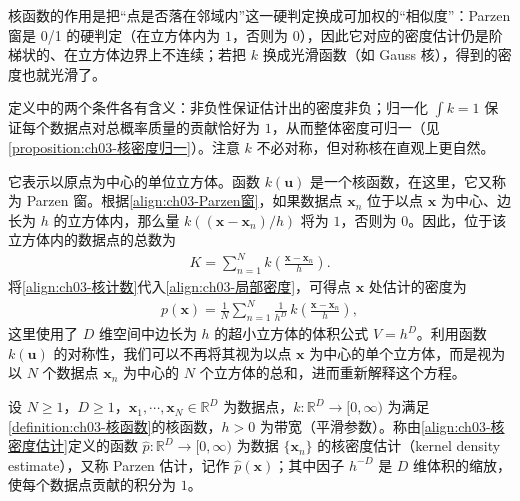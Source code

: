\documentclass[../../main.tex]{subfiles}
\begin{document}
\begin{remark}
核函数的作用是把“点是否落在邻域内”这一硬判定换成可加权的“相似度”：Parzen 窗是 0/1 的硬判定（在立方体内为 $1$，否则为 $0$），因此它对应的密度估计仍是阶梯状的、在立方体边界上不连续；若把 $k$ 换成光滑函数（如 Gauss 核），得到的密度也就光滑了。

定义中的两个条件各有含义：非负性保证估计出的密度非负；归一化 $\int k=1$ 保证每个数据点对总概率质量的贡献恰好为 $1$，从而整体密度可归一（见\cref{proposition:ch03-核密度归一}）。注意 $k$ 不必对称，但对称核在直观上更自然。
\end{remark}

它表示以原点为中心的单位立方体。函数 $k(\boldsymbol{u})$ 是一个核函数，在这里，它又称为 Parzen 窗。根据\eqref{align:ch03-Parzen窗}，如果数据点 $\boldsymbol{x}_n$ 位于以点 $\boldsymbol{x}$ 为中心、边长为 $h$ 的立方体内，那么量 $k((\boldsymbol{x}-\boldsymbol{x}_n)/h)$ 将为 $1$，否则为 $0$。因此，位于该立方体内的数据点的总数为
\begin{align}
K=\sum_{n=1}^{N}k\left(\frac{\boldsymbol{x}-\boldsymbol{x}_n}{h}\right).
\label{align:ch03-核计数}
\end{align}
将\eqref{align:ch03-核计数}代入\eqref{align:ch03-局部密度}，可得点 $\boldsymbol{x}$ 处估计的密度为
\begin{align}
p(\boldsymbol{x})=\frac{1}{N}\sum_{n=1}^{N}\frac{1}{h^{D}}\,k\!\left(\frac{\boldsymbol{x}-\boldsymbol{x}_n}{h}\right),
\label{align:ch03-核密度估计}
\end{align}
这里使用了 $D$ 维空间中边长为 $h$ 的超小立方体的体积公式 $V=h^{D}$。利用函数 $k(\boldsymbol{u})$ 的对称性，我们可以不再将其视为以点 $\boldsymbol{x}$ 为中心的单个立方体，而是视为以 $N$ 个数据点 $\boldsymbol{x}_n$ 为中心的 $N$ 个立方体的总和，进而重新解释这个方程。

\begin{definition}[核密度估计]\label{definition:ch03-核密度}
设 $N\geqslant1$，$D\geqslant1$，$\boldsymbol{x}_1,\cdots,\boldsymbol{x}_N\in\mathbb{R}^{D}$ 为数据点，$k:\mathbb{R}^{D}\to[0,\infty)$ 为满足\cref{definition:ch03-核函数}的核函数，$h>0$ 为带宽（平滑参数）。称由\eqref{align:ch03-核密度估计}定义的函数 $\hat{p}:\mathbb{R}^{D}\to[0,\infty)$ 为数据 $\{\boldsymbol{x}_n\}$ 的核密度估计（kernel density estimate），又称 Parzen 估计，记作 $\hat{p}(\boldsymbol{x})$；其中因子 $h^{-D}$ 是 $D$ 维体积的缩放，使每个数据点贡献的积分为 $1$。
\end{definition}
\end{document}
